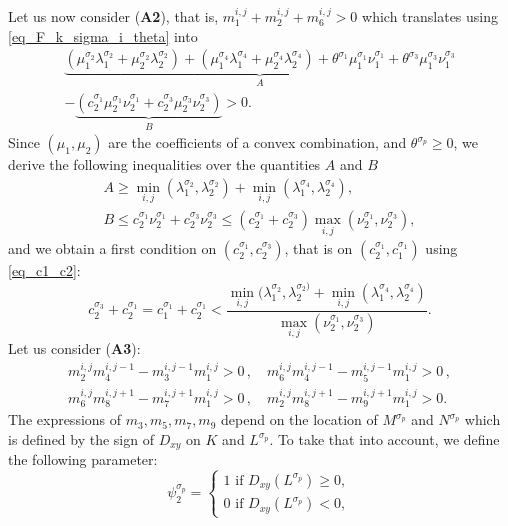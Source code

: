 \documentclass[final,11pt]{elsarticle}
\begin{document}
Let us now consider (\textbf{A2}), that is, $m_{1}^{i,j}+m_2^{i,j}+m_6^{i,j}>0$
which translates using \eqref{eq_F_k_sigma_i_theta} into 
\[
\begin{gathered}
    \underbrace{(\mu_1^{\sigma_2}\lambda_1^{\sigma_2}+\mu_2^{\sigma_2}\lambda_2^{\sigma_2})+(\mu_1^{\sigma_4}\lambda_1^{\sigma_4}+\mu_2^{\sigma_4}\lambda_2^{\sigma_4})+\theta^{\sigma_1}\mu_1^{\sigma_1}\nu_1^{\sigma_1}+\theta^{\sigma_3}\mu_1^{\sigma_3}\nu_1^{\sigma_3}}_{A}\\-\underbrace{(c_2^{\sigma_1}\mu_2^{\sigma_1}\nu_2^{\sigma_1}+c_2^{\sigma_3}\mu_2^{\sigma_3}\nu_2^{\sigma_3})}_{B}>0.
\end{gathered}
\]
Since $(\mu_1,\mu_2)$ are the coefficients of a convex combination, and $\theta^{\sigma_p}\geq 0$, we derive the following inequalities over the quantities $A$ and $B$
\[
\begin{gathered}
    A\geq \min_{i,j}(\lambda_1^{\sigma_2},\lambda_2^{\sigma_2})+\min_{i,j}(\lambda_1^{\sigma_4},\lambda_2^{\sigma_4}),\\
    B\leq c_2^{\sigma_1}\nu_2^{\sigma_1}+c_2^{\sigma_3}\nu_2^{\sigma_3}\leq(c_2^{\sigma_1}+c_2^{\sigma_3})\max_{i,j}(\nu_2^{\sigma_1},\nu_2^{\sigma_3}),
\end{gathered}
\]
and we obtain a first condition on $(c_2^{\sigma_1},c_2^{\sigma_3})$, that is on $(c_2^{\sigma_1},c_1^{\sigma_1})$ using \eqref{eq_c1_c2}:
\begin{equation}\label{eq:cond.m1}
    c_2^{\sigma_3}+c_2^{\sigma_1}=c_1^{\sigma_1}+c_2^{\sigma_1}<\frac{\min_{i,j}(\lambda_1^{\sigma_2},\lambda_2^{\sigma_2)}+\min_{i,j}(\lambda_1^{\sigma_4},\lambda_2^{\sigma_4})}{{\max_{i,j}}(\nu_2^{\sigma_1},\nu_2^{\sigma_3})}.
\end{equation}
Let us consider (\textbf{A3}):
\[
\begin{gathered}
m_{2}^{i, j} m_{4}^{i, j-1}-m_{3}^{i, j-1} m_{1}^{i, j}>0\,,\quad
m_{6}^{i, j} m_{4}^{i, j-1}-m_{5}^{i, j-1} m_{1}^{i, j}>0\,,\\
m_{6}^{i, j} m_{8}^{i, j+1}-m_{7}^{i, j+1} m_{1}^{i, j}>0\,,\quad
m_{2}^{i, j} m_{8}^{i, j+1}-m_{9}^{i, j+1} m_{1}^{i, j}>0.
\end{gathered}
\]
The expressions of $m_3,m_5,m_7,m_9$ depend on the location of $M^{\sigma_p}$ and $N^{\sigma_p}$ which is defined by the sign of $D_{xy}$ on $K$ and $L^{\sigma_p}$. To take that into account, we define the following parameter:
\begin{equation}
\psi_{2}^{\sigma_p}=
\begin{cases}
1 \text{ if }D_{xy}(L^{\sigma_p})\geq 0,\\
0 \text{ if }D_{xy}(L^{\sigma_p})<0,
\end{cases}
\end{equation}
\end{document}

